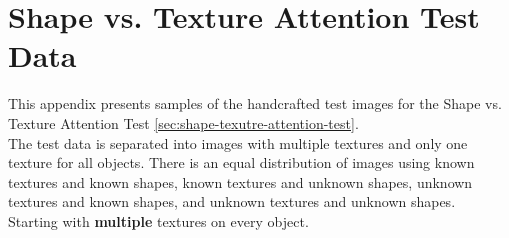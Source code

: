 \chapter{Shape vs. Texture Attention Test Data}
\label{appendix:testdata-examples-bias}

	This appendix presents samples of the handcrafted test images for the Shape vs. Texture Attention Test \ref{sec:shape-texutre-attention-test}.\\
	The test data is separated into images with multiple textures and only one texture for all objects. There is an equal distribution of images using known textures and known shapes, known textures and unknown shapes, unknown textures and known shapes, and unknown textures and unknown shapes.\\
	Starting with \textbf{multiple} textures on every object.
	
